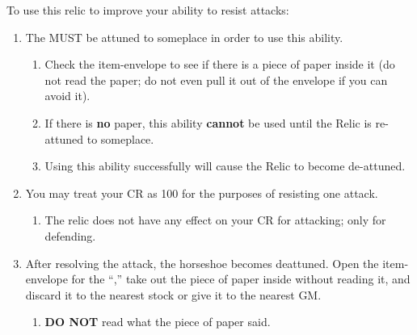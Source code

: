 \documentclass[green]{GL2020}
\begin{document}
To use this relic to improve your ability to resist attacks:
\begin{enumerate}
  \item The \iHorseshoe{} MUST be attuned to someplace in order to use this ability.
  \begin{enumerate}
    \item Check the item-envelope to see if there is a piece of paper inside it (do not read the paper; do not even pull it out of the envelope if you can avoid it).
    \item If there is \textbf{no} paper, this ability \textbf{cannot} be used until the Relic is re-attuned to someplace.
    \item Using this ability successfully will cause the Relic to become de-attuned.
  \end{enumerate}
  \item You may treat your CR as 100 for the purposes of resisting one attack.
  \begin{enumerate}
    \item The relic does not have any effect on your CR for attacking; only for defending.
  \end{enumerate}
  \item After resolving the attack, the horseshoe becomes deattuned. Open the item-envelope for the ``\iHorseshoe{},'' take out the piece of paper inside without reading it, and discard it to the nearest stock or give it to the nearest GM.
  \begin{enumerate}
    \item \textbf{DO NOT} read what the piece of paper said.
  \end{enumerate}
\end{enumerate}
\end{document}

